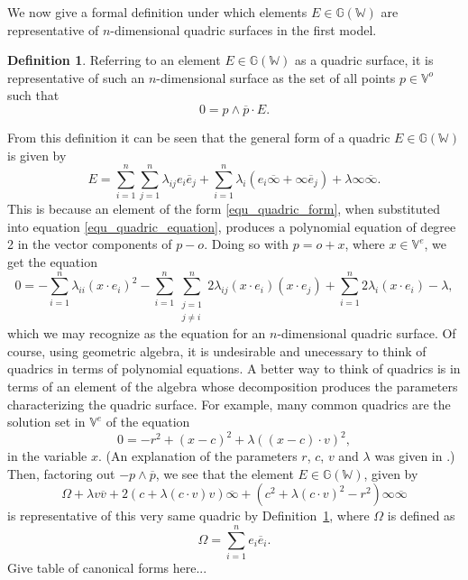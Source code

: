 \documentclass{birkjour}
\theoremstyle{definition}
\newtheorem{defn}[thm]{Definition}
\theoremstyle{remark}
\numberwithin{equation}{section}
\newcommand{\G}{\mathbb{G}}
\newcommand{\V}{\mathbb{V}}
\newcommand{\W}{\mathbb{W}}
\newcommand{\nvao}{o}
\newcommand{\nvai}{\infty}
\newcommand{\nvaib}{\overline{\infty}}
\begin{document}
We now give a formal definition under which elements $E\in\G(\W)$
are representative of $n$-dimensional quadric surfaces in the first model.
\begin{defn}\label{def_quadric}
Referring to an element $E\in\G(\W)$ as a quadric surface, it is representative of such an $n$-dimensional
surface as the set of all points $p\in\V^o$ such that
\begin{equation}\label{equ_quadric_equation}
0 = p\wedge\overline{p}\cdot E.
\end{equation}
\end{defn}
From this definition it can be seen that the general form of a quadric $E\in\G(\W)$ is given by
\begin{equation}\label{equ_quadric_form}
E = \sum_{i=1}^n\sum_{j=1}^n\lambda_{ij}e_i\overline{e}_j+
\sum_{i=1}^n\lambda_i(e_i\nvaib + \nvai\overline{e}_j)+
\lambda\nvai\nvaib.
\end{equation}
This is because an element of the form \eqref{equ_quadric_form}, when
substituted into equation \eqref{equ_quadric_equation}, produces a polynomial
equation of degree 2 in the vector components of $p-\nvao$.
Doing so with $p=\nvao+x$, where $x\in\V^e$, we get the equation
\begin{equation}
0 = -\sum_{i=1}^n\lambda_{ii}(x\cdot e_i)^2-
\sum_{i=1}^n\sum_{\substack{j=1\\j\neq i}}^n 2\lambda_{ij}(x\cdot e_i)(x\cdot e_j)+
\sum_{i=1}^n 2\lambda_i(x\cdot e_i) - \lambda,
\end{equation}
which we may recognize as the equation for an $n$-dimensional quadric surface.
Of course, using geometric algebra, it is undesirable and unecessary to think of
quadrics in terms of polynomial equations.  A better way to think of quadrics is in terms
of an element of the algebra whose decomposition
produces the parameters characterizing the quadric surface.  For example, many common
quadrics are the solution set in $\V^e$ of the equation
\begin{equation}
0 = -r^2 + (x-c)^2 + \lambda((x-c)\cdot v)^2,
\end{equation}
in the variable $x$.  (An explanation of the parameters $r$, $c$, $v$ and $\lambda$
was given in \cite{Parkin12}.)  Then, factoring out $-p\wedge\overline{p}$, we see that
the element $E\in\G(\W)$, given by
\begin{equation}\label{equ_canonical_form_of_common_quadric}
\Omega + \lambda v\overline{v}+2(c+\lambda(c\cdot v)v)\nvaib+
(c^2+\lambda (c\cdot v)^2-r^2)\nvai\nvaib
\end{equation}
is representative of this very same quadric by Definition~\ref{def_quadric},
where $\Omega$ is defined as
\begin{equation}
\Omega = \sum_{i=1}^n e_i\overline{e}_i.
\end{equation}
Give table of canonical forms here...
\end{document}
